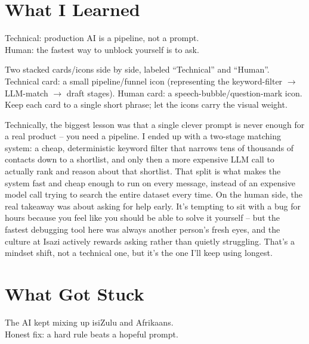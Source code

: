 \documentclass[11pt]{article}
\begin{document}
\section{What I Learned}

\begin{onslide}
Technical: production AI is a pipeline, not a prompt.\\
Human: the fastest way to unblock yourself is to ask.
\end{onslide}

\begin{visual}
Two stacked cards/icons side by side, labeled ``Technical'' and ``Human''. Technical card:
a small pipeline/funnel icon (representing the keyword-filter $\to$ LLM-match $\to$
draft stages). Human card: a speech-bubble/question-mark icon. Keep each card to a
single short phrase; let the icons carry the visual weight.
\end{visual}

\begin{scriptbox}
Technically, the biggest lesson was that a single clever prompt is never enough for a
real product -- you need a pipeline. I ended up with a two-stage matching system: a
cheap, deterministic keyword filter that narrows tens of thousands of contacts down to a
shortlist, and only then a more expensive LLM call to actually rank and reason about
that shortlist. That split is what makes the system fast and cheap enough to run on
every message, instead of an expensive model call trying to search the entire dataset
every time. On the human side, the real takeaway was about asking for help early. It's
tempting to sit with a bug for hours because you feel like you should be able to solve
it yourself -- but the fastest debugging tool here was always another person's fresh
eyes, and the culture at Isazi actively rewards asking rather than quietly struggling.
That's a mindset shift, not a technical one, but it's the one I'll keep using longest.
\end{scriptbox}

\section{What Got Stuck}

\begin{onslide}
The AI kept mixing up isiZulu and Afrikaans.\\
Honest fix: a hard rule beats a hopeful prompt.
\end{onslide}
\end{document}
